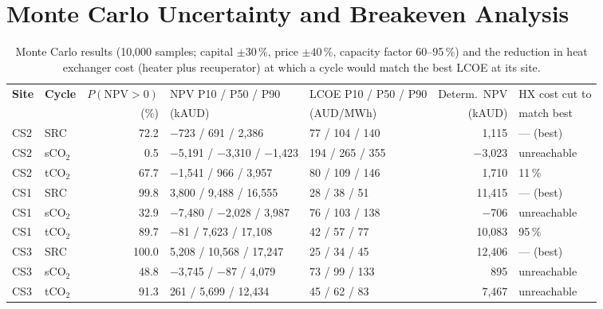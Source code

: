 \section{Monte Carlo Uncertainty and Breakeven Analysis}
\label{sec:rq3_montecarlo}

\begin{table}[H]
\centering
\caption{Monte Carlo results (10,000 samples; capital $\pm 30$\,\%, price
$\pm 40$\,\%, capacity factor 60--95\,\%) and the reduction in heat exchanger
cost (heater plus recuperator) at which a cycle would match the best LCOE at
its site.}
\label{tab:montecarlo}
\renewcommand{\arraystretch}{1.25}
\setlength{\tabcolsep}{3.5pt}
\scriptsize
\begin{tabular}{@{}l l r l l r l@{}}
\toprule
\rowcolor{tableheader}
\textbf{Site} & \textbf{Cycle} & $P(\mathrm{NPV}>0)$ & NPV P10 / P50 / P90 & LCOE P10 / P50 / P90 & Determ.\ NPV & HX cost cut to \\
\rowcolor{tableheader}
 & & (\%) & (kAUD) & (AUD/MWh) & (kAUD) & match best \\
\midrule
\rowcolor{rowgray} CS2 & SRC     & 72.2  & $-$723 / 691 / 2{,}386 & 77 / 104 / 140 & 1{,}115 & --- (best) \\
                   CS2 & sCO$_2$ & 0.5   & $-$5{,}191 / $-$3{,}310 / $-$1{,}423 & 194 / 265 / 355 & $-$3{,}023 & unreachable \\
\rowcolor{rowgray} CS2 & tCO$_2$ & 67.7  & $-$1{,}541 / 966 / 3{,}957 & 80 / 109 / 146 & 1{,}710 & 11\,\% \\
\midrule
                   CS1 & SRC     & 99.8  & 3{,}800 / 9{,}488 / 16{,}555 & 28 / 38 / 51 & 11{,}415 & --- (best) \\
\rowcolor{rowgray} CS1 & sCO$_2$ & 32.9  & $-$7{,}480 / $-$2{,}028 / 3{,}987 & 76 / 103 / 138 & $-$706 & unreachable \\
                   CS1 & tCO$_2$ & 89.7  & $-$81 / 7{,}623 / 17{,}108 & 42 / 57 / 77 & 10{,}083 & 95\,\% \\
\midrule
\rowcolor{rowgray} CS3 & SRC     & 100.0 & 5{,}208 / 10{,}568 / 17{,}247 & 25 / 34 / 45 & 12{,}406 & --- (best) \\
                   CS3 & sCO$_2$ & 48.8  & $-$3{,}745 / $-$87 / 4{,}079 & 73 / 99 / 133 & 895 & unreachable \\
\rowcolor{rowgray} CS3 & tCO$_2$ & 91.3  & 261 / 5{,}699 / 12{,}434 & 45 / 62 / 83 & 7{,}467 & unreachable \\
\bottomrule
\end{tabular}
\end{table}

